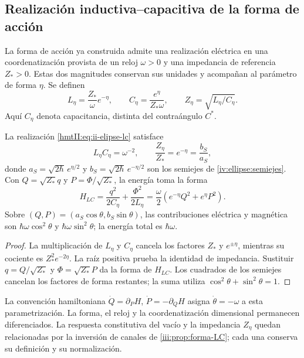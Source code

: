 \subsection{Realización inductiva--capacitiva de la forma de acción}
\label{nuclear:realizacion-lc}

La forma de acción ya construida admite una realización eléctrica en
una coordenatización provista de un reloj \(\omega>0\) y una impedancia de
referencia \(Z_*>0\). Estas dos magnitudes conservan sus unidades y
acompañan al parámetro de forma \(\eta\). Se definen
\begin{equation}
 L_\eta=\frac{Z_*}{\omega}e^{-\eta},\qquad
 C_\eta=\frac{e^\eta}{Z_*\omega},\qquad
 Z_\eta=\sqrt{L_\eta/C_\eta}.
 \label{hmtII:eq:ii-elipse-lc}
\end{equation}
Aquí \(C_\eta\) denota capacitancia, distinta del contraángulo \(C^*\).

\begin{proposition}
\label{nuclear:lc-producto}
La realización \eqref{hmtII:eq:ii-elipse-lc} satisface
\begin{equation}
 L_\eta C_\eta=\omega^{-2},\qquad
 \frac{Z_\eta}{Z_*}=e^{-\eta}=\frac{b_S}{a_S},
 \label{hmtII:eq:ii-elipse-impedancia}
\end{equation}
donde \(a_S=\sqrt{2\hbar}\,e^{\eta/2}\) y
\(b_S=\sqrt{2\hbar}\,e^{-\eta/2}\) son los semiejes de
\cref{iv:ellipse:semiejes}.
Con \(Q=\sqrt{Z_*}q\) y \(P=\Phi/\sqrt{Z_*}\), la energía toma la forma
\[
 H_{LC}=\frac{q^2}{2C_\eta}+\frac{\Phi^2}{2L_\eta}
       =\frac\omega2(e^{-\eta}Q^2+e^\eta P^2).
\]
Sobre \((Q,P)=(a_S\cos\theta,b_S\sin\theta)\), las contribuciones
eléctrica y magnética son \(\hbar\omega\cos^2\theta\) y
\(\hbar\omega\sin^2\theta\); la energía total es \(\hbar\omega\).
\end{proposition}
\begin{proof}
La multiplicación de \(L_\eta\) y \(C_\eta\) cancela los factores
\(Z_*\) y \(e^{\pm\eta}\), mientras su cociente es
\(Z_*^2e^{-2\eta}\). La raíz positiva prueba la identidad de impedancia.
Sustituir \(q=Q/\sqrt{Z_*}\) y \(\Phi=\sqrt{Z_*}P\) da la forma
de \(H_{LC}\). Los cuadrados de los semiejes cancelan los factores
de forma restantes; la suma utiliza \(\cos^2\theta+\sin^2\theta=1\).
\end{proof}

La convención hamiltoniana
\(\dot Q=\partial_PH\), \(\dot P=-\partial_QH\) asigna
\(\dot\theta=-\omega\) a esta parametrización. La forma, el reloj
y la coordenatización dimensional permanecen diferenciados. La respuesta
constitutiva del vacío y la impedancia \(Z_\eta\) quedan relacionadas
por la inversión de canales de \cref{iii:prop:forma-LC}; cada una
conserva su definición y su normalización.
